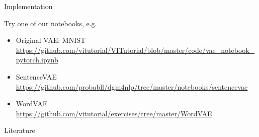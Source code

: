 \begin{frame}{Implementation}

Try one of our notebooks, e.g.
\begin{itemize}
	\item Original VAE: MNIST\\
	\url{https://github.com/vitutorial/VITutorial/blob/master/code/vae_notebook_pytorch.ipynb}
	\item SentenceVAE\\
	\url{https://github.com/probabll/dgm4nlp/tree/master/notebooks/sentencevae}	
	\item WordVAE \\
	\url{https://github.com/vitutorial/exercises/tree/master/WordVAE}
\end{itemize}
\end{frame}

\begin{frame}[allowframebreaks]{Literature}
\nocite{KingmaWelling:2013}
\nocite{HintonEtAl:1995}
\nocite{RezendeEtAl:2014}
\nocite{TitsiasLazarogredilla:2014}
\nocite{KucukelbirEtAl:2017}
\nocite{alemi2018fixing}
\nocite{chen2016variational}
\nocite{pelsmaeker2019effective}



\end{frame}

